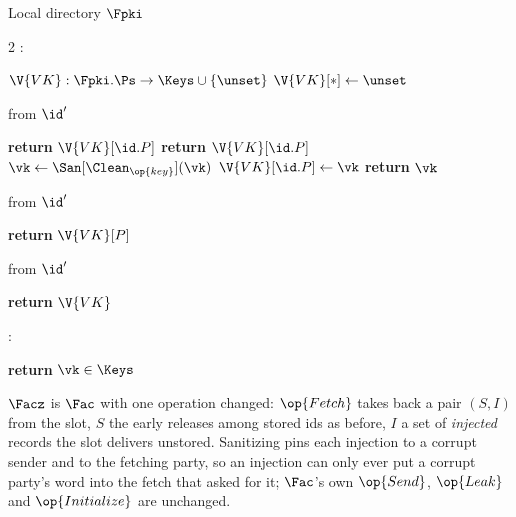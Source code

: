 \documentclass[10pt,oneside,openany]{book}
\theoremstyle{accentdef}
\theoremstyle{accentplain}
\begin{document}
\begin{interface}[nofloat]{Local directory $\Fpki$ \\
\params{$\PID$, \quad $\Ps$, \quad $\admits$, \quad $\uses := \emptyset$, \quad $\pars := \none$}}

{\scriptsize
\setlength{\columnsep}{1.4em}
\begin{multicols}{2}
:
\begin{algorithmic}[1]
\setcounter{contline}{0}\algcont
\State $\V{VK} : \Fpki.\Ps \to \Keys \cup \{\unset\}$
\State $\V{VK}[*] \gets \unset$
\algsave
\end{algorithmic}
\vspace{1.4ex}

 \quad from $\id'$
\begin{algorithmic}[1]
\algcont
{}
  \State \textbf{return} $\V{VK}[\id.P]$ \label{ln:rpkipeek}
\EndIf
{}
  \State \textbf{return} $\V{VK}[\id.P]$ \label{ln:rpkifixed}
\EndIf
\State $\vk \gets \San[\Clean_{\op{key}}](\vk)$
\State $\V{VK}[\id.P] \gets \vk$ \label{ln:rpkiwrite}
\State \textbf{return} $\vk$
\algsave
\end{algorithmic}
\vspace{1.4ex}

\columnbreak

 \quad from $\id'$
\begin{algorithmic}[1]
\algcont
\State \textbf{return} $\V{VK}[P]$
\algsave
\end{algorithmic}
\vspace{1.4ex}

 \quad from $\id'$
\begin{algorithmic}[1]
\algcont
\State \textbf{return} $\V{VK}$
\algsave
\end{algorithmic}
\vspace{1.4ex}

:
\begin{algorithmic}[1]
\algcont
\State \textbf{return} $\vk \in \Keys$
\algsave
\end{algorithmic}
\end{multicols}}
\end{interface}

$\Facz$ is $\Fac$ with one operation changed: $\op{Fetch}$ takes back a pair $(S,I)$ from the
slot, $S$ the early releases among stored ids as before, $I$ a set of \emph{injected} records the
slot delivers unstored. Sanitizing pins each injection to a corrupt sender and to the fetching
party, so an injection can only ever put a corrupt party's word into the fetch that asked for it;
$\Fac$'s own $\op{Send}$, $\op{Leak}$ and $\op{Initialize}$ are unchanged.
\end{document}
